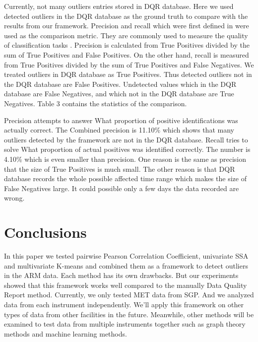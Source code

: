 \documentclass[letterpaper, 10 pt, conference]{ieeeconf}  %
\begin{document}
Currently, not many outliers entries stored in DQR database. Here we used detected outliers in the DQR database as the ground truth to compare with the results from our framework. Precision and recall which were first defined in \cite{perry1955machine} were used as the comparison metric. They are commonly used to measure the quality of classification tasks \cite{olson2008advanced}. Precision is calculated from True Positives divided by the sum of True Positives and False Positives. On the other hand, recall is measured from True Positives divided by the sum of True Positives and False Negatives. We treated outliers in DQR database as True Positives. Thus detected outliers not in the DQR database are False Positives. Undetected values which in the DQR database are False Negatives, and which not in the DQR database are True Negatives. Table 3 contains the statistics of the comparison.

Precision attempts to answer What proportion of positive identifications was actually correct. The Combined precision is 11.10\% which shows that many outliers detected by the framework are not in the DQR database. Recall tries to solve What proportion of actual positives was identified correctly. The number is 4.10\% which is even smaller than precision. One reason is the same as precision that the size of True Positives is much small. The other reason is that DQR database records the whole possible affected time range which makes the size of False Negatives large. It could possible only a few days the data recorded are wrong.

\section{Conclusions}
In this paper we tested pairwise Pearson Correlation Coefficient, univariate SSA and multivariate K-means and combined them as a framework to detect outliers in the ARM data. Each method has its own drawbacks. But our experiments showed that this framework works well compared to the manually Data Quality Report method. Currently, we only tested MET data from SGP. And we analyzed data from each instrument independently. We'll apply this framework on other types of data from other facilities in the future. Meanwhile, other methods will be examined to test data from multiple instruments together such as graph theory methods \cite{phillips2015graph} and machine learning methods. 

\end{document}
